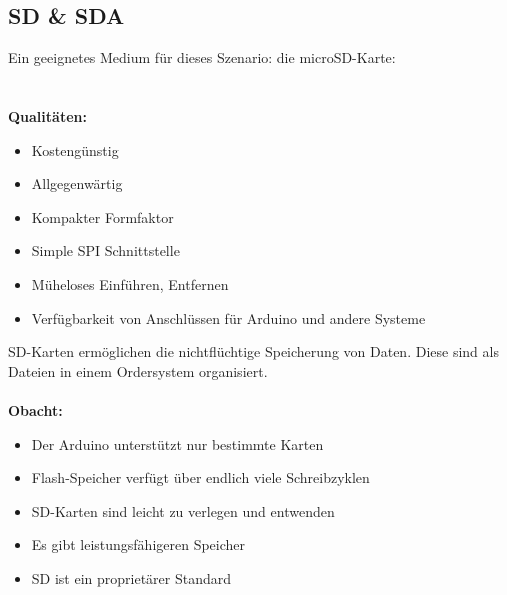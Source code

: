 \documentclass[ngerman]{schoolPres}
\begin{document}
  \subsection{SD \& SDA}%
  \begin{frame}
    Ein geeignetes Medium für dieses Szenario: die microSD-Karte:\\
    \\~\\

    \textbf{Qualitäten:}
    \begin{itemize}
      \item Kostengünstig
      \item Allgegenwärtig
      \item Kompakter Formfaktor
      \item Simple SPI Schnittstelle
      \item Müheloses Einführen, Entfernen
      \item Verfügbarkeit von Anschlüssen für Arduino und andere Systeme
    \end{itemize}


  \end{frame}

  \begin{frame}
    SD-Karten ermöglichen die nichtflüchtige Speicherung von Daten.
    Diese sind als Dateien in einem Ordersystem organisiert.\\~\\

    \textbf{Obacht:}
    \begin{itemize}
      \item Der Arduino unterstützt nur bestimmte Karten\cite{sd-lib}
      \item Flash-Speicher verfügt über endlich viele Schreibzyklen\cite{zhang2017flash,sd-lifespan}
      \item SD-Karten sind leicht zu verlegen und entwenden
      \item Es gibt leistungsfähigeren Speicher
      \item SD ist ein proprietärer Standard\cite{sd-proprietary}
    \end{itemize}

  \end{frame}
\end{document}
